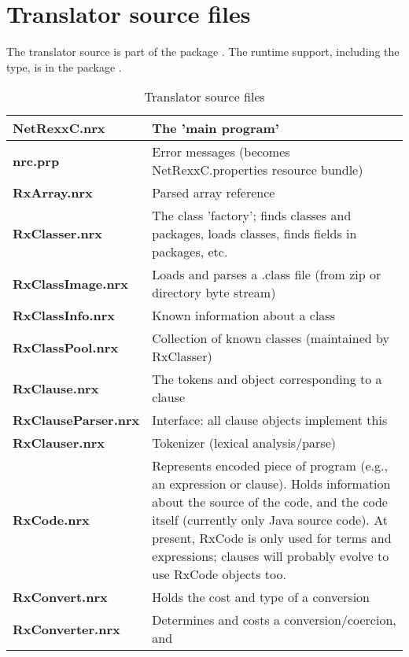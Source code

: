 {\section{Translator source files}
The translator source is part of the package
. The runtime support, including the
 type, is in the package . 
\begin{table}\caption{Translator source files}
\begin{tabularx}{\textwidth}{>{\bfseries}lX}
\toprule
  NetRexxC.nrx        & The 'main program'
\\\midrule
  nrc.prp             & Error messages (becomes NetRexxC.properties
                         resource bundle)
\\\midrule
  RxArray.nrx         & Parsed array reference
\\\midrule
  RxClasser.nrx       & The class 'factory'; finds classes and
                         packages, loads classes, finds fields in
                         packages, etc.
\\\midrule
  RxClassImage.nrx    & Loads and parses a .class file (from zip or
                         directory byte stream)
\\\midrule
  RxClassInfo.nrx     & Known information about a class
\\\midrule
  RxClassPool.nrx     & Collection of known classes (maintained by
                         RxClasser)
\\\midrule
  RxClause.nrx        & The tokens and object corresponding to a
  clause
\\\midrule
  RxClauseParser.nrx  & Interface: all clause objects implement this
\\\midrule
  RxClauser.nrx       & Tokenizer (lexical analysis/parse)
\\\midrule
  RxCode.nrx          & Represents encoded piece of program (e.g., an
                         expression or clause).  Holds information about
                         the source of the code, and the code itself
                         (currently only Java source code).
                         At present, RxCode is only used for terms and
                         expressions; clauses will probably evolve to
                         use RxCode objects too.
\\\midrule
  RxConvert.nrx       & Holds the cost and type of a conversion
\\\midrule
  RxConverter.nrx     & Determines and costs a conversion/coercion, and

\end{tabularx}
\end{table}}
